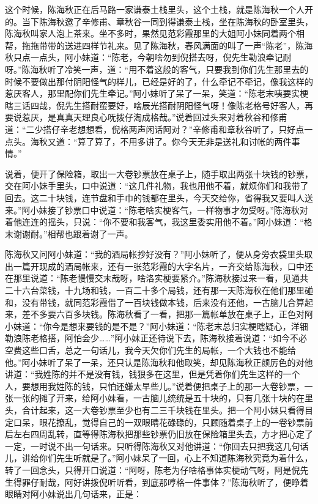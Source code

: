 \documentclass[12pt,UTF8]{ctexbook}
\begin{document}
{{{这个时候，陈海秋正在后马路一家谦泰土栈里头，这个土栈，就是陈海秋一个人开的。当下陈海秋邀了辛修甫、章秋谷一同到得谦泰土栈，坐在陈海秋的卧室里头，陈海秋叫家人泡上茶来。坐不多时，果然见范彩霞那里的大姐阿小妹同着两个相帮，拖拖带带的送进四样节礼来。见了陈海秋，春风满面的叫了一声“陈老”，陈海秋只点一点头，阿小妹道：“陈老，今朝啥勿到倪搭去呀，倪先生勒浪牵记耐呀。”陈海秋听了冷笑一声，道：“用不着这般的客气，只要我到你们先生那里去的时候不要做出那付阴阳怪气的样儿，已经是好的了，什么牵记不牵记，像我这样的惹厌客人，那里配你们先生牵记。”阿小妹听了呆了一呆，笑道：“陈老末咦要实梗瞎三话四哉，倪先生搭耐蛮要好，啥辰光搭耐阴阳怪气呀！像陈老格号好客人，再要说惹厌，是真真天理良心呒拨仔淘成格哉。”说着回过头来对着秋谷和修甫道：“二少搭仔辛老想想看，倪格两声闲话阿对？”辛修甫和章秋谷听了，只好点一点头。海秋又道：“算了算了，不用多讲了。你今天无非是送礼和讨帐的两件事情。”

说着，便开了保险箱，取出一大卷钞票放在桌子上，随手取出两张十块钱的钞票，交在阿小妹手里头，口中说道：“这几件礼物，我也用他不着，就烦你们和我带了回去。这二十块钱，连节盘和手巾的钱都在里头，今天交给你，省得我又要叫人送来。”阿小妹接了钞票口中说道：“陈老啥实梗客气，一样物事才勿受呀。”陈海秋对着他连连的摇头，只说：“你不要和我客气，我这里委实用他不着。”阿小妹道：“格末谢谢耐。”相帮也跟着谢了一声。

陈海秋又问阿小妹道：“我的酒局帐抄好没有？”阿小妹听了，便从身旁衣袋里头取出一篇开现成的酒局帐来，还有一张范彩霞的大字名片，一齐交给陈海秋，口中还在那里说道：“陈老慢慢交末哉呀，啥洛实梗要紧介。”陈海秋接过来一看，见通共二十六台菜钱，十九场和钱，一百二十多个局钱，还有那一天陈海秋在他们那里碰和，没有带钱，就同范彩霞借了一百块钱做本钱，后来没有还他，一古脑儿合算起来，差不多要六百多块钱。陈海秋看了一看，把那一篇帐单放在桌子上，正色对阿小妹道：“你今是想来要钱的是不是？”阿小妹道：“陈老末总归实梗瞎疑心，洋钿勒浪陈老格搭，阿怕会少……”阿小妹正还待说下去，陈海秋接着说道：“如今不必空费这些口舌，总之一句话儿，我今天欠你们先生的局帐，一个大钱也不能给他。”阿小妹听了呆了一呆，还只认是陈海秋和他取笑，却见陈海秋正颜厉色的对他讲道：“我姓陈的并不是没有钱，钱狠多在这里，但是凭着你们先生这样的一个人，要想用我姓陈的钱，只怕还嫌太早些儿。”说着便把桌子上的那一大卷钞票，一张一张的摊了开来，给阿小妹看，一古脑儿统统是五十块的，只有几张十块的在里头，合计起来，这一大卷钞票至少也有二三千块钱在里头。把一个阿小妹只看得目定口呆，眼花撩乱，觉得自己的一双眼睛花碌碌的，只顾随着桌子上的一卷钞票前后左右四周乱转，直等得陈海秋把那些钞票仍旧放在保险箱里头去，方才把心定了一定，一时说不出一句话来。只听得陈海秋又对他讲道：“你回去只把我这几句话儿，讲给你们先生听就是了。”阿小妹呆了一回，心上不知道陈海秋究竟为着什么，转了一回念头，只得开口说道：“阿呀，陈老为仔啥格事体实梗动气呀，阿是倪先生得罪仔耐哉，阿好讲拨倪听听看，到底那哼格一件事体？”陈海秋听了，便睁着眼睛对阿小妹说出几句话来，正是：

}}}
\end{document}
